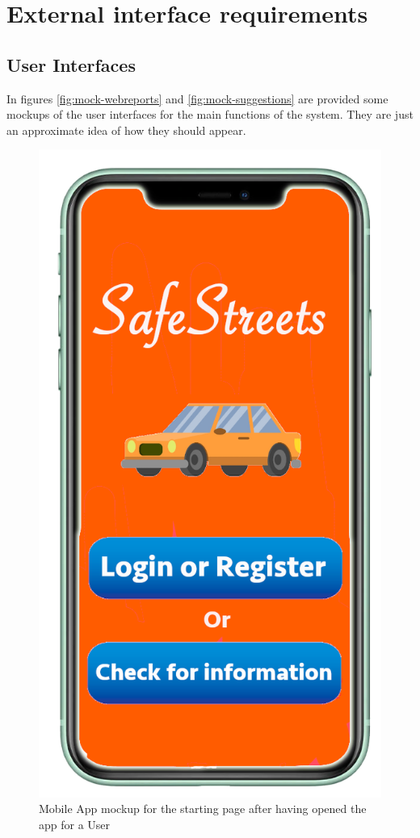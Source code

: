 \documentclass[a4paper]{report}
\begin{document}
\section{External interface requirements}
\subsection{User Interfaces}
In figures \ref{fig:mock-webreports} and \ref{fig:mock-suggestions} are provided some mockups of the user interfaces for the main functions of the system. They are just an approximate idea of how they should appear.
\begin{figure}
\begin{minipage}{.45\textwidth}
\centering
\includegraphics[width=.7\linewidth]{mockups/phoneschermatainiziale.png}
\caption[Mobile App mockup for initial page]{Mobile App mockup for the starting page after having opened the app for a User}
\label{fig:initial-page}
\end{minipage}\hfill

\end{figure}
\end{document}
